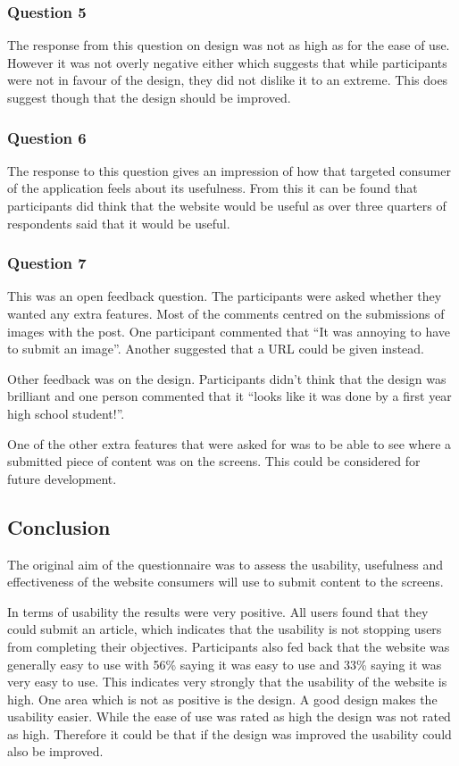 \subsubsection*{Question 5}
The response from this question on design was not as high as for the ease of use. However it was not overly negative either which suggests that while participants were not in favour of the design, they did not dislike it to an extreme. This does suggest though that the design should be improved.

\subsubsection*{Question 6}
The response to this question gives an impression of how that targeted consumer of the application feels about its usefulness. From this it can be found that participants did think that the website would be useful as over three quarters of respondents said that it would be useful.

\subsubsection*{Question 7}
This was an open feedback question. The participants were asked whether they wanted any extra features. Most of the comments centred on the submissions of images with the post. One participant commented that ``It was annoying to have to submit an image''. Another suggested that a URL could be given instead. 

Other feedback was on the design. Participants didn't think that the design was brilliant and one person commented that it ``looks like it was done by a first year high school student!''.

One of the other extra features that were asked for was to be able to see where a submitted piece of content was on the screens. This could be considered for future development.

\clearpage{}
\subsection{Conclusion}

The original aim of the questionnaire was to assess the usability, usefulness and effectiveness of the website consumers will use to submit content to the screens. 

In terms of usability the results were very positive. All users found that they could submit an article, which indicates that the usability is not stopping users from completing their objectives. Participants also fed back that the website was generally easy to use with 56\% saying it was easy to use and 33\% saying it was very easy to use. This indicates very strongly that the usability of the website is high. One area which is not as positive is the design. A good design makes the usability easier. While the ease of use was rated as high the design was not rated as high. Therefore it could be that if the design was improved the usability could also be improved.


